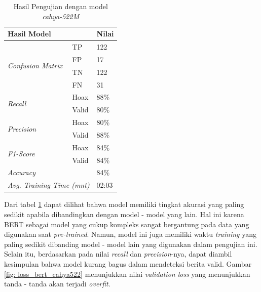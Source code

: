 \begin{table}[h]
    \caption{Hasil Pengujian dengan model \textit{cahya-522M}}
    \label{tab: loss_cahya522}
    \centering
    \begin{tabular}{|l|l|l|}
        \hline
        \multicolumn{2}{|l|}{\textbf{Hasil Model}}              & \textbf{Nilai}        \\ \hline
        \multirow{4}{*}{\textit{Confusion Matrix}}              & TP             & 122  \\ \cline{2-3}
                                                                & FP             & 17   \\ \cline{2-3}
                                                                & TN             & 122  \\ \cline{2-3}
                                                                & FN             & 31   \\ \hline
        \multirow{2}{*}{\textit{Recall}}                        & Hoax           & 88\% \\ \cline{2-3}
                                                                & Valid          & 80\% \\ \hline
        \multirow{2}{*}{\textit{Precision}}                     & Hoax           & 80\% \\ \cline{2-3}
                                                                & Valid          & 88\% \\ \hline
        \multirow{2}{*}{\textit{F1-Score}}                      & Hoax           & 84\% \\ \cline{2-3}
                                                                & Valid          & 84\% \\ \hline
        \multicolumn{2}{|l|}{\textit{Accuracy}}                 & 84\%                  \\ \hline
        \multicolumn{2}{|l|}{\textit{Avg. Training Time (mnt)}} & 02:03                 \\ \hline
    \end{tabular}
\end{table}

Dari tabel \ref{tab: loss_cahya522} dapat dilihat bahwa model memiliki tingkat akurasi yang paling sedikit apabila dibandingkan dengan model - model yang lain. Hal ini karena BERT sebagai model yang cukup kompleks sangat bergantung pada data yang digunakan saat \textit{pre-trained}. Namun, model ini juga memiliki waktu \textit{training} yang paling sedikit dibanding model - model lain yang digunakan dalam pengujian ini. Selain itu, berdasarkan pada nilai \textit{recall} dan \textit{precision}-nya, dapat diambil kesimpulan bahwa model kurang bagus dalam mendeteksi berita valid. Gambar \ref{fig: loss_bert_cahya522} menunjukkan nilai \textit{validation loss} yang menunjukkan tanda - tanda akan terjadi \textit{overfit}.

